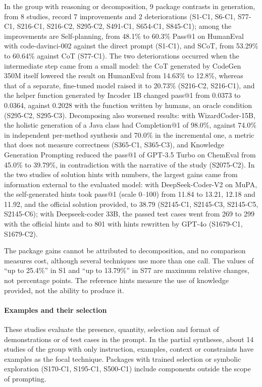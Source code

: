 In the group with reasoning or decomposition, 9 package contrasts in generation, from 8 studies, record 7 improvements and 2 deteriorations (S1-C1, S6-C1, S77-C1, S216-C1, S216-C2, S295-C2, S491-C1, S654-C1, S845-C1); among the improvements are Self-planning, from 48.1\% to 60.3\% Pass@1 on HumanEval with code-davinci-002 against the direct prompt (S1-C1), and SCoT, from 53.29\% to 60.64\% against CoT (S77-C1).
The two deteriorations occurred when the intermediate step came from a small model: the CoT generated by CodeGen 350M itself lowered the result on HumanEval from 14.63\% to 12.8\%, whereas that of a separate, fine-tuned model raised it to 20.73\% (S216-C2, S216-C1), and the helper function generated by Incoder 1B changed pass@1 from 0.0373 to 0.0364, against 0.2028 with the function written by humans, an oracle condition (S295-C2, S295-C3).
Decomposing also worsened results: with WizardCoder-15B, the holistic generation of a Java class had Completion@1 of 98.0\%, against 74.0\% in independent per-method synthesis and 70.0\% in the incremental one, a metric that does not measure correctness (S365-C1, S365-C3), and Knowledge Generation Prompting reduced the pass@1 of GPT-3.5 Turbo on ChemEval from 45.0\% to 39.79\%, in contradiction with the narrative of the study (S2075-C2).
In the two studies of solution hints with numbers, the largest gains came from information external to the evaluated model: with DeepSeek-Coder-V2 on MuPA, the self-generated hints took pass@1 (scale 0--100) from 11.84 to 13.21, 12.18 and 11.92, and the official solution provided, to 38.79 (S2145-C1, S2145-C3, S2145-C5, S2145-C6); with Deepseek-coder 33B, the passed test cases went from 269 to 299 with the official hints and to 801 with hints rewritten by GPT-4o (S1679-C1, S1679-C2).

The package gains cannot be attributed to decomposition, and no comparison measures cost, although several techniques use more than one call. The values of ``up to 25.4\%'' in S1 and ``up to 13.79\%'' in S77 are maximum relative changes, not percentage points. The reference hints measure the use of knowledge provided, not the ability to produce it.

\paragraph{Examples and their selection}
These studies evaluate the presence, quantity, selection and format of demonstrations or of test cases in the prompt. In the partial syntheses, about 14 studies of the group with only instruction, examples, context or constraints have examples as the focal technique. Packages with trained selection or symbolic exploration (S170-C1, S195-C1, S500-C1) include components outside the scope of prompting.

